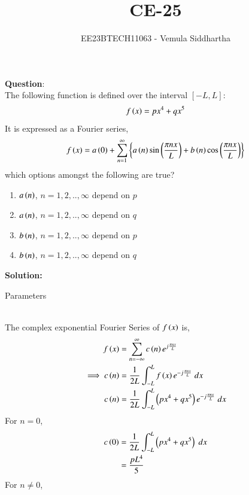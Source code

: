 \documentclass[journal,12pt,twocolumn]{IEEEtran}
\theoremstyle{remark}
\begin{document}

\vspace{3cm}

\title{CE-25}
\author{EE23BTECH11063 - Vemula Siddhartha}
\maketitle
\newpage
\bigskip

\renewcommand{\thefigure}{\theenumi}
\renewcommand{\thetable}{\theenumi}
\textbf{Question}:\\
The following function is defined over the interval $[-L,L]$:
    $$f\left(x\right)=px^4+qx^5$$
It is expressed as a Fourier series,
    $$f\left(x\right)=a\left(0\right)+\sum_{n=1}^{\infty}\left\{a\left(n\right)\sin\left(\frac{\pi n x}{L}\right)+b\left(n\right)\cos\left(\frac{\pi n x}{L}\right)\right\}$$
which options amongst the following are true?
\begin{enumerate}[label=(\alph*)]
    \item $a\left(n\right)$, $n=1,2,..,\infty$ depend on $p$
    \item $a\left(n\right)$, $n=1,2,..,\infty$ depend on $q$
    \item $b\left(n\right)$, $n=1,2,..,\infty$ depend on $p$
    \item $b\left(n\right)$, $n=1,2,..,\infty$ depend on $q$
\end{enumerate}
\textbf{Solution:}
\begin{table}[h!]    
    \centering
    
    \caption{Parameters}
    \label{tab:CE:25}
\end{table}\\
The complex exponential Fourier Series of $f\left(x\right)$ is,
\begin{align}
    f\left(x\right)&=\sum_{n=-\infty}^{\infty}c\left(n\right)e^{j\frac{\pi nx}{L}}\\
    \implies c\left(n\right)&=\frac{1}{2L}\int_{-L}^{L}f\left(x\right)e^{-j\frac{\pi n x}{L}}\;dx\\
    c\left(n\right)&=\frac{1}{2L}\int_{-L}^{L}\left(px^4+qx^5\right)e^{-j\frac{\pi n x}{L}}\;dx
\end{align}
For $n=0$, 
\begin{align}
    c\left(0\right)&=\frac{1}{2L}\int_{-L}^{L}\left(px^4+qx^5\right)\;dx\\
    &=\frac{pL^4}{5}
\end{align}
For $n\neq0$,
\end{document}
